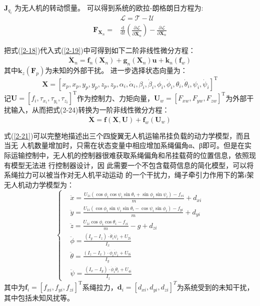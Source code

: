 \documentclass[lang=chs, degree=master, blindreview=false, winfonts=true]{yanputhesis}
\begin{document}
$\boldsymbol{J}_{q_{i}}$ 为无人机的转动惯量。
可以得到系统的欧拉-朗格朗日方程为:
\begin{equation}
\begin{aligned}
	&\mathcal{L}=\mathcal{T}-\mathcal{U} \\
	\boldsymbol{F}_{\boldsymbol{X}_n}=&\frac{\mathrm{d}}{\mathrm{d}t}\left(\frac{\partial\mathcal{L}}{\partial\dot{\boldsymbol{X}_n}}\right)-\frac{\partial\mathcal{L}}{\partial\boldsymbol{X}_n}
\end{aligned}
\label{2-19}
\end{equation}


把式(\ref{2-18})代入式(\ref{2-19})中可得到如下二阶非线性微分方程：
\begin{equation}	
	\dot{\bm X}_n=\bm f_n(\bm X_n)+\bm g_n(\bm X_n)\bm u+\bm k_{n}\left(\bm f_{w}\right)
\end{equation}
其中$\bm k_{z}\left(\bm F_{p}\right)$为未知的外部干扰。
进一步选择状态向量为：$$\bm X=\left[x_{p},x_{p},y_{p},y_{p},z_{p},z_{p},\alpha_{i},\dot{\alpha}_{i},\beta_{i},\dot{\beta}_{i},\phi_{i},\dot{\phi}_{i},\theta_{i},\dot{\theta}_{i},\psi_{i},\dot{\psi}_{i}\right]^\mathrm{T}$$
记$\bm{U}=\left[f_i,\tau_{x_i},\tau_{y_i},\tau_{z_i}\right]^\mathrm{T}$作为控制力、力矩向量，${\boldsymbol{U}}_{w}=\left[F_{xw},F_{yw},F_{zw}\right]^\mathrm{T}$为外部干扰输入，从而把式(2-24)转换为一阶非线性微分方程：
\begin{equation}
	\dot{\boldsymbol{X}}=\bm f\left(\boldsymbol{X},\boldsymbol{U}\right)+\bm f_w\left(\boldsymbol{U}_w\right)
	\label{2-21}
\end{equation}

式(\ref{2-21})可以完整地描述出三个四旋翼无人机运输吊挂负载的动力学模型，而且当无
人机数量增加时，只需在状态变量中相应增加系绳偏角α、β即可。但是在实际运输控制中，无人机的控制器很难获取系绳偏角和吊挂载荷的位置信息，依照现有模型无法进
行控制器设计，因
此需要一个不包含载荷信息的简化模型，可以将系绳拉力可以被当作对无人机平动运动
的一个干扰力，绳子牵引力作用下的第$i$架无人机动力学模型为： 
\begin{equation}
	\left\{
	\begin{aligned}
		&\ddot{x}=\frac{U_{1i}\left(\cos\phi_i\cos\psi_i\sin\theta_i+\sin\phi_i\sin\psi_i\right)-f_{xi}}{m}+d_{xi}\\
		&\ddot{y}=\frac{U_{1i}\left(\cos\phi_i\sin\psi_i\sin\theta_i-\cos\psi_i\sin\phi_i\right)-f_{yi}}{m}+d_{yi}\\
		&\ddot{z}=\frac{U_{1i}\cos\phi_i\cos\theta_i-f_{zi}}{m}-g+d_{zi}\\
		&\ddot{\phi}=\frac{(I_{y}-I_{z})\cdot \dot{\theta}_i\dot{\psi}_i+U_{2i}}{I_{x}}\\
		&\ddot{\theta}=\frac{(I_{z}-I_{x})\cdot \dot{\phi}_i\dot{\psi}_i+U_{3i}}{I_{y}}\\
		&\ddot{\psi}=\frac{(I_{x}-I_{y})\cdot \dot{\phi}_i\dot{\theta}_i+U_{4i}}{I_{z}}\end{aligned}
	\right.
	\label{2-22}
\end{equation}
其中为$\boldsymbol{f}_{i}=
\left[f_{xi} , f_{yi} , f_{zi}\right]^\mathrm{T}$系绳拉力，$\bm d_i=\left[d_{xi},d_{yi},d_{zi}\right]^T$为系统受到的未知干扰，其中包括未知风扰等。 
\end{document}
